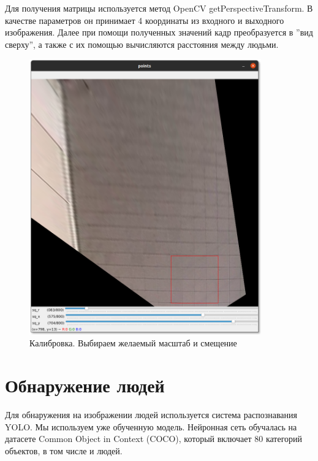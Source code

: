 Для получения матрицы используется метод OpenCV getPerspectiveTransform. В качестве параметров он принимает 4 координаты из входного и выходного изображения. Далее при помощи полученных значений кадр преобразуется в ''вид сверху'', а также с их помощью вычисляются  расстояния между людьми.


\begin{figure}[H]
    \centering
    \includegraphics[width=10cm]{images/calibration2.png}
    \caption{Калибровка. Выбираем желаемый масштаб и смещение}
    \label{<label>}
\end{figure}


\section{Обнаружение людей}

Для обнаружения на изображении людей используется система распознавания YOLO. Мы используем уже обученную модель. Нейронная сеть обучалась на датасете Common Object in Context (COCO), который включает 80 категорий объектов, в том числе и людей.



